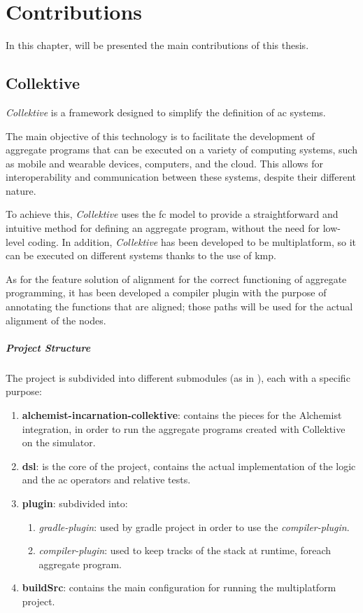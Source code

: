 \chapter{Contributions}
\label{ch:contributions}
In this chapter, will be presented the main contributions of this thesis.

\section{Collektive}
\label{sec:collektive}
\emph{Collektive} is a framework designed to simplify the definition of \ac{ac} systems.

The main objective of this technology is to facilitate the development of aggregate programs that can be executed on a
variety of computing systems, such as mobile and wearable devices, computers, and the cloud.
This allows for interoperability and communication between these systems, despite their different nature.

To achieve this, \emph{Collektive} uses the \ac{fc} model to provide a straightforward and intuitive method for defining
an aggregate program, without the need for low-level coding.
In addition, \emph{Collektive} has been developed to be multiplatform, so it can be executed on different systems thanks
to the use of \ac{kmp}.

As for the feature solution of alignment for the correct functioning of aggregate programming,
it has been developed a compiler plugin with the purpose of annotating the functions that are aligned;
those paths will be used for the actual alignment of the nodes.

\paragraph{Project Structure}
The project is subdivided into different submodules (as in ), each with a specific purpose:

\begin{enumerate}
    \item \textbf{alchemist-incarnation-collektive}: contains the pieces for the Alchemist integration,
        in order to run the aggregate programs created with Collektive on the simulator.
    \item \textbf{dsl}: is the core of the project, contains the actual implementation of the logic and the \ac{ac} operators
        and relative tests.
    \item \textbf{plugin}: subdivided into:
        \begin{enumerate}
            \item \emph{gradle-plugin}: used by gradle project in order to use the \emph{compiler-plugin}.
            \item \emph{compiler-plugin}: used to keep tracks of the stack at runtime, foreach aggregate program.
        \end{enumerate}
    \item \textbf{buildSrc}: contains the main configuration for running the multiplatform project.
\end{enumerate}

